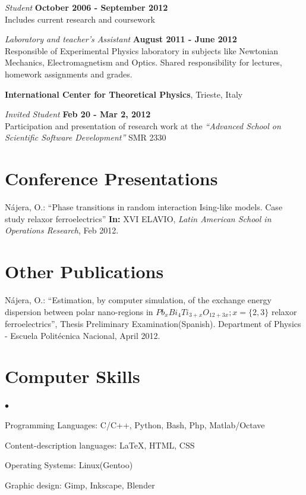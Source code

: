 \documentclass[margin,line]{res}
\newenvironment{list2}{
  \begin{list}{$\bullet$}{%
      \setlength{\itemsep}{0in}
      \setlength{\parsep}{0in} \setlength{\parskip}{0in}
      \setlength{\topsep}{0in} \setlength{\partopsep}{0in} 
      \setlength{\leftmargin}{0.2in}}}{\end{list}}
\begin{document}
\begin{resume}
    {\em Student} \hfill {\bf October 2006 - September 2012}\\
    Includes current research and coursework

    {\em Laboratory and teacher's Assistant} \hfill {\bf August 2011 - June 2012}\\
    Responsible of Experimental Physics laboratory in subjects
    like Newtonian Mechanics, Electromagnetism and Optics.
    Shared responsibility for lectures, homework assignments and grades.


  {\bf International Center for Theoretical Physics}, Trieste, Italy
    \vspace{-.3cm}

    {\em Invited Student} \hfill {\bf Feb 20 - Mar 2, 2012} \\
    Participation and presentation of research work at the {\em ``Advanced School on Scientific
    Software Development''} SMR 2330

\section{\sc Conference Presentations}
  Nájera, O.: ``Phase transitions in random interaction Ising-like models. Case study relaxor
  ferroelectrics'' {\bf In:} XVI ELAVIO, {\em Latin American School in Operations Research}, Feb 2012.

\section{\sc Other Publications}
  Nájera, O.: ``Estimation, by computer simulation, of the exchange energy dispersion between
  polar nano-regions in $Pb_xBi_4Ti_{3+x}O_{12+3x}; x=\{2,3\}$ relaxor ferroelectrics'', Thesis
  Preliminary Examination(Spanish). Department of Physics - Escuela Politécnica Nacional, April 2012.


\section{\sc Computer Skills}
  \begin{list2}
    \item Programming Languages:  C/C++, Python, Bash, Php, Matlab/Octave
    \item Content-description languages: \LaTeX, HTML, CSS
    \item Operating Systems:  Linux(Gentoo)
    \item Graphic design: Gimp, Inkscape, Blender
  \end{list2}


\end{resume}
\end{document}
